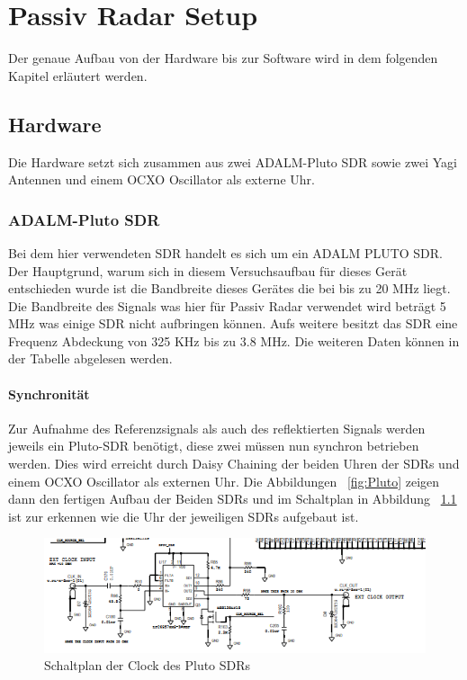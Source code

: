 \chapter{Passiv Radar Setup}\label{sct:setup}
Der genaue Aufbau von der Hardware bis zur Software wird in dem folgenden Kapitel erläutert werden.
\section{Hardware}
Die Hardware setzt sich zusammen aus zwei ADALM-Pluto SDR sowie zwei Yagi Antennen und einem OCXO Oscillator als externe Uhr.
\subsection{ADALM-Pluto SDR}\label{sct:sdr}
Bei dem hier verwendeten SDR handelt es sich um ein ADALM
PLUTO SDR. Der Hauptgrund, warum sich in diesem Versuchsaufbau für dieses Gerät entschieden wurde ist die Bandbreite dieses Gerätes die bei bis zu 20 MHz liegt. Die Bandbreite des Signals was hier für Passiv Radar verwendet wird beträgt  5 MHz was einige SDR nicht aufbringen können.  Aufs weitere besitzt das SDR eine Frequenz Abdeckung von 325 KHz bis zu 3.8 MHz. Die weiteren Daten können in der Tabelle abgelesen werden. 
\subsubsection{Synchronität}\label{sct:Oscillator}
Zur Aufnahme des Referenzsignals als auch des reflektierten Signals werden jeweils ein Pluto-SDR benötigt, diese zwei müssen nun synchron betrieben werden. Dies wird erreicht durch Daisy Chaining  der beiden Uhren der SDRs und einem OCXO Oscillator als externen Uhr. Die Abbildungen ~\ref{fig:Pluto} zeigen dann den fertigen Aufbau der Beiden SDRs und im Schaltplan in Abbildung ~\ref{fig:Clock} ist zur erkennen wie die Uhr der jeweiligen SDRs aufgebaut ist.

\begin{figure}
    \centering
    \includegraphics[width=\textwidth]{images/Schaltplan_Clock.png}
    \caption{Schaltplan der Clock des Pluto SDRs} \label{fig:Clock}
\end{figure}

